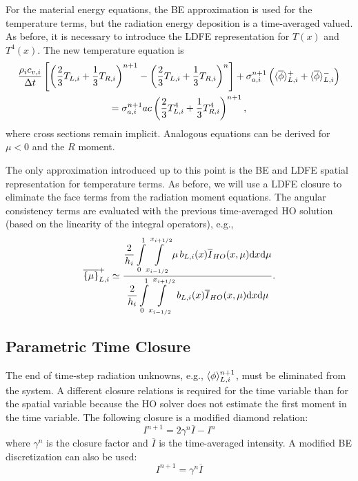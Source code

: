 For the material energy equations, the BE approximation is used for the temperature
terms, but the radiation energy deposition is a
time-averaged valued.  As before, it is necessary to introduce the LDFE representation for
$T(x)$ and $T^4(x)$.  The new temperature equation is 
\begin{multline}\label{eq:Tt_moml_ex}
     \frac{\rho_i c_{v,i}}{\Delta t}\left[ \left(\frac{2}{3}T_{L,i} + \frac{1}{3}T_{R,i}
        \right)^{n+1} - \left(\frac{2}{3}T_{L,i} + \frac{1}{3}T_{R,i}
    \right)^{n} \right]  + \sigma_{a,i}^{n+1} \left( \langle \overline{\phi} \rangle_{L,i}^+ +
    \langle \overline{\phi} \rangle_{L,i}^- \right) \\ = \sigma_{a,i}^{n+1}a c
\left( \frac{2}{3} T_{L,i}^4 + \frac{1}{3}T_{R,i}^4
        \right)^{n+1},
\end{multline}
where cross sections remain implicit.
Analogous equations can be derived for $\mu<0$ and the $R$ moment.

The only approximation
introduced up to this point is the BE and LDFE spatial representation for temperature
terms.  As before, we
will use a LDFE closure to eliminate the face terms from the radiation moment equations.
The angular consistency terms are evaluated with the previous time-averaged HO solution
(based on the linearity of the integral operators), e.g.,
\begin{equation}
    \overline{\left\{ {\mu} \right\}}_{L,i}^{+} \simeq  \frac{ \displaystyle
{\displaystyle \frac{2}{h_i}} \int\limits_0^1 \int\limits_{{x_{i-1/2}}}^{{x_{i+1/2}}} \mu \, b_{L,i}(x)
\overline{I}_{HO}(x,\mu) \mathrm{d} x \mathrm{d} \mu } 
{\displaystyle {\displaystyle \frac{2}{h_i}} \int\limits_0^1 \int\limits_{{x_{i-1/2}}}^{{x_{i+1/2}}} \, b_{L,i}(x)
\overline I_{HO}(x,\mu) \mathrm{d} x \mathrm{d} \mu } .
\end{equation}
\subsection{Parametric Time Closure}
%

The end of time-step radiation unknowns, e.g., $\langle \phi \rangle_{L,i}^{n+1}$, must be
eliminated from the system.  A different closure relations is required for the time
variable than for the spatial variable because the HO solver does not estimate the first
moment in the time variable.  The following closure is a modified diamond
relation:
\begin{equation}\label{eq:tc_diam}
    I^{n+1} = 2\gamma^{n} \overline{I} - I^{n}
\end{equation}
where $\gamma^{n}$ is the closure factor and $\overline{I}$ is the time-averaged
intensity.  A modified BE discretization can also be used:
\begin{equation}\label{eq:tc_avg}
    I^{n+1} = \gamma^{n} \overline{I}
\end{equation}

